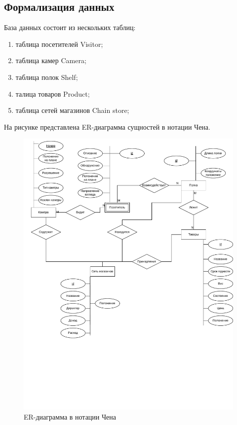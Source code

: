 \subsection{Формализация данных}

База данных состоит из нескольких таблиц:

\begin{enumerate}[label=\arabic*.]
	\item таблица посетителей Visitor;
	\item таблица камер Camera;
	\item таблица полок Shelf;
	\item талица товаров Product;
	\item таблица сетей магазинов Chain store;
\end{enumerate}

На рисунке представлена ER-диаграмма сущностей в нотации Чена.

\begin{figure}[ht!]
	\centering
	\includegraphics[width=0.9\linewidth]{assets/images/ER.drawio.pdf}
	\caption{ER-диаграмма в нотации Чена}
	\label{fig:anal:chen}
\end{figure}
\FloatBarrier

